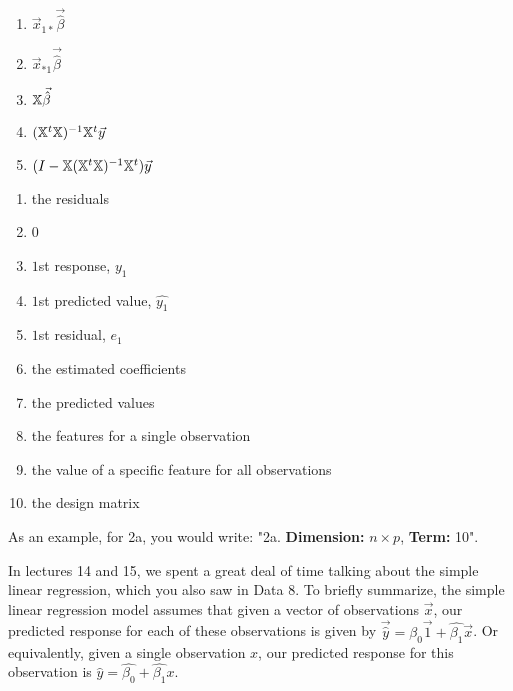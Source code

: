 \documentclass[addpoints, 12pt]{exam}
\begin{document}
\begin{questions}
\begin{multicols}{2}
\begin{enumerate}[label = \alph*.]
      \item $\vec{x}_{1*}\vec{\hat{\beta}}$ 
      
      \item $\vec{x}_{*1}\vec{\hat{\beta}}$ 
      
        \item  $\Bbb{X}\vec{\hat{\beta}}$ 
        
      \item $(\Bbb{X}^t\Bbb{X})^{-1}\Bbb{X}^t \vec{y}$ 
      

      
      \item $(I - \Bbb{X}(\Bbb{X}^t\Bbb{X})^{-1}\Bbb{X}^t) \vec{y}$ 
      

    \vspace{1in}

    \end{enumerate}
    \begin{enumerate}
      \item the residuals 
      \item 0
      \item $1$st response, $y_1$
      \item $1$st predicted value, $\hat{y_1}$
      \item $1$st residual, $e_1$
      \item the estimated coefficients
      \item the predicted values
      \item the features for a single observation
      \item the value of a specific feature for all observations
      \item the design matrix
    \end{enumerate}
\end{multicols}

As an example, for 2a, you would write: "2a. \textbf{Dimension:} $n \times p$, \textbf{Term:} 10". \\ 


\newpage


\vspace{-1em}

In lectures 14 and 15, we spent a great deal of time talking about the simple linear regression, which you also saw in Data 8. To briefly summarize, the simple linear regression model assumes that given a vector of observations $\vec{x}$, our predicted response for each of these observations is given by $\vec{\hat{y}} = \hat{\beta_0}\vec{1} + \hat{\beta_1}\vec{x}$. Or equivalently, given a single observation $x$, our predicted response for this observation is $\hat{y} = \hat{\beta_0} + \hat{\beta_1}x$.


\end{questions}
\end{document}
